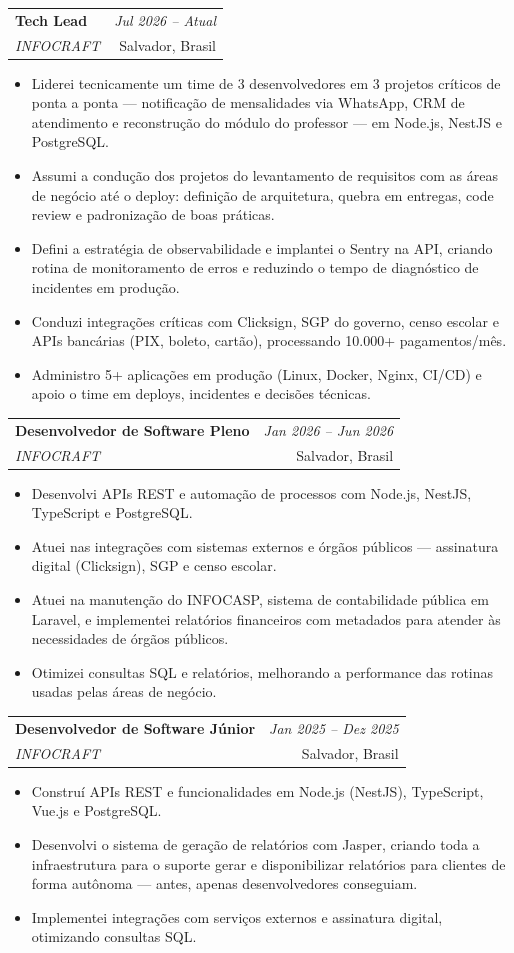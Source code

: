\documentclass[a4paper,9pt]{article}
\makeatletter
\newcommand{\resumeSubheading}[4]{
\vspace{0.3mm}\item
    \begin{tabular*}{0.98\textwidth}[t]{l@{\extracolsep{\fill}}r}
        \textbf{#1} & \textit{\footnotesize{#4}} \\
        \textit{\footnotesize{#3}} &  \footnotesize{#2}\\
    \end{tabular*}
    \vspace{-2mm}
}
\newcommand{\resumeItemListStart}{\begin{justify}\begin{itemize}[leftmargin=3ex, rightmargin=2ex, noitemsep,labelsep=1.2mm,itemsep=0mm]\small}
\newcommand{\resumeItemListEnd}{\end{itemize}\end{justify}\vspace{-1.5mm}}
\makeatother
\begin{document}
  \resumeSubheading
  {Tech Lead}{Salvador, Brasil}
  {INFOCRAFT}{Jul 2026 -- Atual}
  \resumeItemListStart
    \item{Liderei tecnicamente um time de 3 desenvolvedores em 3 projetos críticos de ponta a ponta — notificação de mensalidades via WhatsApp, CRM de atendimento e reconstrução do módulo do professor — em Node.js, NestJS e PostgreSQL.}
    \item{Assumi a condução dos projetos do levantamento de requisitos com as áreas de negócio até o deploy: definição de arquitetura, quebra em entregas, code review e padronização de boas práticas.}
    \item{Defini a estratégia de observabilidade e implantei o Sentry na API, criando rotina de monitoramento de erros e reduzindo o tempo de diagnóstico de incidentes em produção.}
    \item{Conduzi integrações críticas com Clicksign, SGP do governo, censo escolar e APIs bancárias (PIX, boleto, cartão), processando 10.000+ pagamentos/mês.}
    \item{Administro 5+ aplicações em produção (Linux, Docker, Nginx, CI/CD) e apoio o time em deploys, incidentes e decisões técnicas.}
  \resumeItemListEnd

  \resumeSubheading
  {Desenvolvedor de Software Pleno}{Salvador, Brasil}
  {INFOCRAFT}{Jan 2026 -- Jun 2026}
  \resumeItemListStart
    \item{Desenvolvi APIs REST e automação de processos com Node.js, NestJS, TypeScript e PostgreSQL.}
    \item{Atuei nas integrações com sistemas externos e órgãos públicos — assinatura digital (Clicksign), SGP e censo escolar.}
    \item{Atuei na manutenção do INFOCASP, sistema de contabilidade pública em Laravel, e implementei relatórios financeiros com metadados para atender às necessidades de órgãos públicos.}
    \item{Otimizei consultas SQL e relatórios, melhorando a performance das rotinas usadas pelas áreas de negócio.}
  \resumeItemListEnd

  \resumeSubheading
  {Desenvolvedor de Software Júnior}{Salvador, Brasil}
  {INFOCRAFT}{Jan 2025 -- Dez 2025}
  \resumeItemListStart
    \item{Construí APIs REST e funcionalidades em Node.js (NestJS), TypeScript, Vue.js e PostgreSQL.}
    \item{Desenvolvi o sistema de geração de relatórios com Jasper, criando toda a infraestrutura para o suporte gerar e disponibilizar relatórios para clientes de forma autônoma — antes, apenas desenvolvedores conseguiam.}
    \item{Implementei integrações com serviços externos e assinatura digital, otimizando consultas SQL.}
  \resumeItemListEnd
\end{document}
